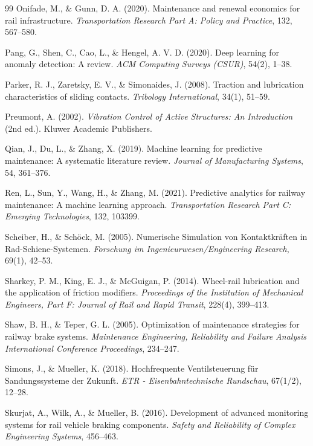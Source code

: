 \documentclass[a4paper,12pt]{article}
\theoremstyle{definition}
\begin{document}
\begin{thebibliography}{99}
 Onifade, M., \& Gunn, D. A. (2020). Maintenance and renewal economics for rail infrastructure. \textit{Transportation Research Part A: Policy and Practice}, 132, 567--580.

 Pang, G., Shen, C., Cao, L., \& Hengel, A. V. D. (2020). Deep learning for anomaly detection: A review. \textit{ACM Computing Surveys (CSUR)}, 54(2), 1--38.

 Parker, R. J., Zaretsky, E. V., \& Simonaides, J. (2008). Traction and lubrication characteristics of sliding contacts. \textit{Tribology International}, 34(1), 51--59.

 Preumont, A. (2002). \textit{Vibration Control of Active Structures: An Introduction} (2nd ed.). Kluwer Academic Publishers.

 Qian, J., Du, L., \& Zhang, X. (2019). Machine learning for predictive maintenance: A systematic literature review. \textit{Journal of Manufacturing Systems}, 54, 361--376.

 Ren, L., Sun, Y., Wang, H., \& Zhang, M. (2021). Predictive analytics for railway maintenance: A machine learning approach. \textit{Transportation Research Part C: Emerging Technologies}, 132, 103399.

 Scheiber, H., \& Schöck, M. (2005). Numerische Simulation von Kontaktkräften in Rad-Schiene-Systemen. \textit{Forschung im Ingenieurwesen/Engineering Research}, 69(1), 42--53.

 Sharkey, P. M., King, E. J., \& McGuigan, P. (2014). Wheel-rail lubrication and the application of friction modifiers. \textit{Proceedings of the Institution of Mechanical Engineers, Part F: Journal of Rail and Rapid Transit}, 228(4), 399--413.

 Shaw, B. H., \& Teper, G. L. (2005). Optimization of maintenance strategies for railway brake systems. \textit{Maintenance Engineering, Reliability and Failure Analysis International Conference Proceedings}, 234--247.

 Simons, J., \& Mueller, K. (2018). Hochfrequente Ventilsteuerung für Sandungssysteme der Zukunft. \textit{ETR - Eisenbahntechnische Rundschau}, 67(1/2), 12--28.

 Skurjat, A., Wilk, A., \& Mueller, B. (2016). Development of advanced monitoring systems for rail vehicle braking components. \textit{Safety and Reliability of Complex Engineering Systems}, 456--463.


\end{thebibliography}
\end{document}
